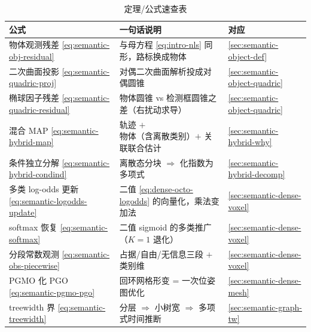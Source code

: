 \begin{table}[H]\centering\small
\caption{定理/公式速查表}
\begin{tabular}{lll}
\toprule
公式 & 一句话说明 & 对应 \\
\midrule
物体观测残差 \cref{eq:semantic-obj-residual} & 与母方程 \cref{eq:intro-nls} 同形，路标换成物体 & \cref{sec:semantic-object-def} \\
二次曲面投影 \cref{eq:semantic-quadric-proj} & 对偶二次曲面解析投成对偶圆锥 & \cref{sec:semantic-object-quadric} \\
椭球因子残差 \cref{eq:semantic-quadric-residual} & 物体圆锥 vs 检测框圆锥之差（右扰动求导） & \cref{sec:semantic-object-quadric} \\
混合 MAP \cref{eq:semantic-hybrid-map} & 轨迹 $+$ 物体（含离散类别）$+$ 关联联合估计 & \cref{sec:semantic-hybrid-why} \\
条件独立分解 \cref{eq:semantic-hybrid-condind} & 离散态分块 $\Rightarrow$ 化指数为多项式 & \cref{sec:semantic-hybrid-decomp} \\
多类 log-odds 更新 \cref{eq:semantic-logodds-update} & 二值 \cref{eq:dense-octo-logodds} 的向量化，乘法变加法 & \cref{sec:semantic-dense-voxel} \\
softmax 恢复 \cref{eq:semantic-softmax} & 二值 sigmoid 的多类推广（$K{=}1$ 退化） & \cref{sec:semantic-dense-voxel} \\
分段常数观测 \cref{eq:semantic-obs-piecewise} & 占据/自由/无信息三段 $+$ 类别维 & \cref{sec:semantic-dense-voxel} \\
PGMO 化 PGO \cref{eq:semantic-pgmo-pgo} & 回环网格形变 = 一次位姿图优化 & \cref{sec:semantic-dense-mesh} \\
treewidth 界 \cref{eq:semantic-treewidth} & 分层 $\Rightarrow$ 小树宽 $\Rightarrow$ 多项式时间推断 & \cref{sec:semantic-graph-tw} \\
\bottomrule
\end{tabular}
\end{table}

